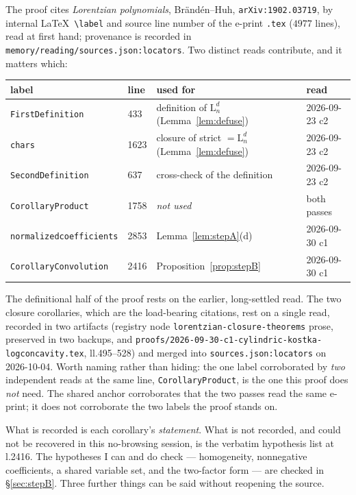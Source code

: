 \documentclass[11pt]{article}
\theoremstyle{plain}
\theoremstyle{definition}
\begin{document}
The proof cites \emph{Lorentzian polynomials}, Brändén--Huh, \texttt{arXiv:1902.03719}, by
internal \LaTeX\ \verb|\label| and source line number of the e-print \texttt{.tex}
($4977$ lines), read at first hand; provenance is recorded in
\texttt{memory/reading/sources.json:locators}. Two distinct reads contribute, and it
matters which:

\begin{center}
\begin{tabular}{llll}
\hline
label & line & used for & read\\
\hline
\verb|FirstDefinition| & 433 & definition of $\mathrm L^d_n$ (Lemma~\ref{lem:defuse}) & 2026-09-23 c2\\
\verb|chars| & 1623 & closure of strict $=\mathrm L^d_n$ (Lemma~\ref{lem:defuse}) & 2026-09-23 c2\\
\verb|SecondDefinition| & 637 & cross-check of the definition & 2026-09-23 c2\\
\verb|CorollaryProduct| & 1758 & \emph{not used} & both passes\\
\verb|normalizedcoefficients| & 2853 & Lemma~\ref{lem:stepA}(d) & 2026-09-30 c1\\
\verb|CorollaryConvolution| & 2416 & Proposition~\ref{prop:stepB} & 2026-09-30 c1\\
\hline
\end{tabular}
\end{center}

The definitional half of the proof rests on the earlier, long-settled read. The two closure
corollaries, which are the load-bearing citations, rest on a single read, recorded in two
artifacts (registry node \texttt{lorentzian-closure-theorems} prose, preserved in two
backups, and \texttt{proofs/2026-09-30-c1-cylindric-kostka-logconcavity.tex}, ll.495--528)
and merged into \texttt{sources.json:locators} on 2026-10-04. Worth naming rather than
hiding: the one label corroborated by \emph{two} independent reads at the same line,
\verb|CorollaryProduct|, is the one this proof does \emph{not} need. The shared anchor
corroborates that the two passes read the same e-print; it does not corroborate the two
labels the proof stands on.

What is recorded is each corollary's \emph{statement}. What is not recorded, and could not
be recovered in this no-browsing session, is the verbatim hypothesis list at l.2416. The
hypotheses I can and do check --- homogeneity, nonnegative coefficients, a shared variable
set, and the two-factor form --- are checked in \S\ref{sec:stepB}. Three further things
can be said without reopening the source.
\end{document}
